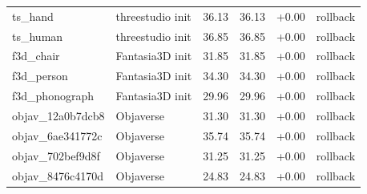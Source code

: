 \begin{table}[t]
\begin{tabular}{@{}llrrrl@{}}
ts\_hand & threestudio init & 36.13 & 36.13 & +0.00 & rollback \\
ts\_human & threestudio init & 36.85 & 36.85 & +0.00 & rollback \\
f3d\_chair & Fantasia3D init & 31.85 & 31.85 & +0.00 & rollback \\
f3d\_person & Fantasia3D init & 34.30 & 34.30 & +0.00 & rollback \\
f3d\_phonograph & Fantasia3D init & 29.96 & 29.96 & +0.00 & rollback \\
objav\_12a0b7dcb8 & Objaverse & 31.30 & 31.30 & +0.00 & rollback \\
objav\_6ae341772c & Objaverse & 35.74 & 35.74 & +0.00 & rollback \\
objav\_702bef9d8f & Objaverse & 31.25 & 31.25 & +0.00 & rollback \\
objav\_8476c4170d & Objaverse & 24.83 & 24.83 & +0.00 & rollback \\
\bottomrule
\end{tabular}
\end{table}
